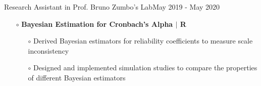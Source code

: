 \documentclass[]{resume}
\begin{document}
\begin{rSection}{}
\begin{itemize}
\begin{itemize}
         
     \end{itemize} 
\end{itemize}
{ Research Assistant in Prof. Bruno Zumbo's Lab}\hfill{May 2019 - May 2020 }\vspace{-0.5em}
 \begin{itemize}\item[$\circ$] \textbf{Bayesian Estimation for Cronbach's Alpha $\mid$ R}\vspace{-0.5em}
 \begin{itemize}\itemsep-0.5em
         \item[$\circ$] Derived Bayesian estimators for reliability coefficients to measure scale inconsistency
         \item[$\circ$]
         Designed and implemented simulation studies to compare the properties of different Bayesian estimators
     
     \end{itemize} 
 \end{itemize}
 \end{rSection}
 \vspace{-0.7em}
\end{document}
